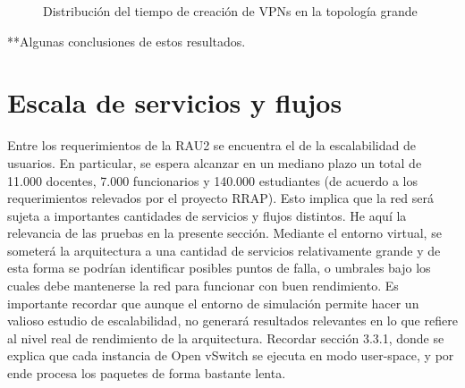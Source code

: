 \begin{figure}[H]
	\caption{Distribución del tiempo de creación de VPNs en la topología grande}
	\centering
	\label{fig:gráfica_tiempo_grande}
\end{figure}

**Algunas conclusiones de estos resultados.


\section{Escala de servicios y flujos}
Entre los requerimientos de la RAU2 se encuentra el de la escalabilidad de usuarios. En particular, se espera alcanzar en un mediano plazo un total de 11.000 docentes, 7.000 funcionarios y 140.000 estudiantes (de acuerdo a los requerimientos relevados por el proyecto RRAP). Esto implica que la red será sujeta a importantes cantidades de servicios y flujos distintos. He aquí la relevancia de las pruebas en la presente sección. Mediante el entorno virtual, se someterá la arquitectura a una cantidad de servicios relativamente grande y de esta forma se podrían identificar posibles puntos de falla, o umbrales bajo los cuales debe mantenerse la red para funcionar con buen rendimiento. Es importante recordar que aunque el entorno de simulación permite hacer un valioso estudio de escalabilidad, no generará resultados relevantes en lo que refiere al nivel real de rendimiento de la arquitectura. Recordar sección 3.3.1, donde se explica que cada instancia de Open vSwitch se ejecuta en modo user-space, y por ende procesa los paquetes de forma bastante lenta.

